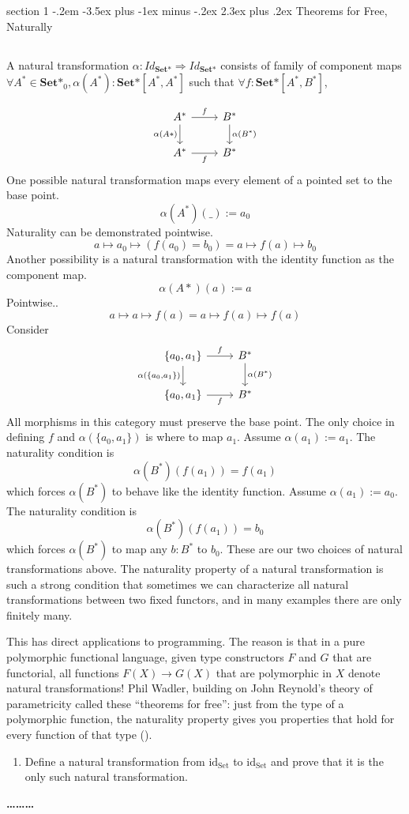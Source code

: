 \documentclass[12pt]{article}
\makeatletter
\theoremstyle{definition}
\newenvironment{problem}{\@startsection
       {section}
       {1}
       {-.2em}
       {-3.5ex plus -1ex minus -.2ex}
       {2.3ex plus .2ex}
       {\pagebreak[3]%
       \large\bf\noindent{Problem }
       }
       }
       {%
       \begin{center}\large\bf \ldots\ldots\ldots\end{center}}
\newcommand{\Set}{\textrm{Set}}
\newcommand{\id}{\textrm{id}}
\makeatother
\begin{document}
\begin{problem}{Theorems for Free, Naturally}
\subsection{}
A natural transformation $\alpha : Id_{\textbf{Set*}} \Rightarrow Id_{\textbf{Set*}}$ consists of family of component maps $\forall A^* \in \textbf{Set*}_0, \alpha(A^*):\textbf{Set*}[A^*,A^*]$ such that $\forall f : \textbf{Set*}[A^*,B^*]$,

\[
    \begin{tikzcd}
        A^* \arrow[r, "f"] \arrow[d, "\alpha(A*)"'] & B^* \arrow[d, "\alpha(B^*)"] \\
        A^* \arrow[r, "f"'] & B^*
        \end{tikzcd}
\]
One possible natural transformation maps every element of a pointed set to the base point.
\[
  \alpha(A^*)(\_):=  a_0  
\]
Naturality can be demonstrated pointwise. 
\[
    a \mapsto a_0 \mapsto (f(a_0)=b_0) = a \mapsto f(a) \mapsto b_0
\]
Another possibility is a natural transformation with the identity function as the component map.
\[
\alpha(A*)(a) := a    
\]
Pointwise..
\[
    a \mapsto a \mapsto f(a) = a \mapsto f(a) \mapsto f(a)
\]
Consider
\[
    \begin{tikzcd}
        \{a_0,a_1\} \arrow[r, "f"] \arrow[d, "{\alpha(\{a_0,a_1\})}"'] & B^* \arrow[d, "\alpha(B^*)"] \\
        \{a_0,a_1\} \arrow[r, "f"'] & B^*
        \end{tikzcd}
\]
All morphisms in this category must preserve the base point. The only choice in defining $f$ and $\alpha(\{a_0,a_1\})$ is where to map $a_1$. Assume $\alpha(a_1) := a_1$. The naturality condition is 
\[
  \alpha(B^*)(f(a_1))= f(a_1)  
\] 
which forces $\alpha(B^*)$ to behave like the identity function. Assume $\alpha(a_1):= a_0$. The naturality condition is 
\[
    \alpha(B^*)(f(a_1)) = b_0
\]
which forces $\alpha(B^*)$ to map any $b : B^*$ to $b_0$. These are our two choices of natural transformations above.
\newpage
  The naturality property of a natural transformation is such a strong
  condition that sometimes we can characterize all natural
  transformations between two fixed functors, and in many examples
  there are only finitely many.
  
  This has direct applications to programming. The reason is that in a
  pure polymorphic functional language, given type constructors $F$
  and $G$ that are functorial, all functions $F(X) \to G(X)$ that are
  polymorphic in $X$ denote natural transformations! Phil Wadler,
  building on John Reynold's theory of parametricity called these
  ``theorems for free'': just from the type of a polymorphic function,
  the naturality property gives you properties that hold for every
  function of that type (\cite{wadler,reynolds}).
  \begin{enumerate}
  \item Define a natural transformation from $\id_{\Set}$ to
    $\id_{\Set}$ and prove that it is the only such natural
    transformation.


\end{enumerate}
\end{problem}
\end{document}
